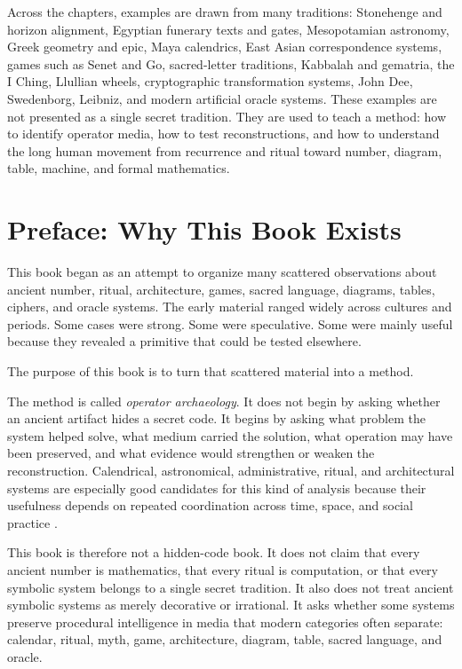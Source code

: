 \documentclass[11pt]{book}
\begin{document}
Across the chapters, examples are drawn from many traditions: Stonehenge and horizon alignment, Egyptian funerary texts and gates, Mesopotamian astronomy, Greek geometry and epic, Maya calendrics, East Asian correspondence systems, games such as Senet and Go, sacred-letter traditions, Kabbalah and gematria, the I Ching, Llullian wheels, cryptographic transformation systems, John Dee, Swedenborg, Leibniz, and modern artificial oracle systems. These examples are not presented as a single secret tradition. They are used to teach a method: how to identify operator media, how to test reconstructions, and how to understand the long human movement from recurrence and ritual toward number, diagram, table, machine, and formal mathematics.

\chapter*{Preface: Why This Book Exists}

This book began as an attempt to organize many scattered observations about ancient number, ritual, architecture, games, sacred language, diagrams, tables, ciphers, and oracle systems. The early material ranged widely across cultures and periods. Some cases were strong. Some were speculative. Some were mainly useful because they revealed a primitive that could be tested elsewhere.

The purpose of this book is to turn that scattered material into a method.

The method is called \emph{operator archaeology}. It does not begin by asking whether an ancient artifact hides a secret code. It begins by asking what problem the system helped solve, what medium carried the solution, what operation may have been preserved, and what evidence would strengthen or weaken the reconstruction. Calendrical, astronomical, administrative, ritual, and architectural systems are especially good candidates for this kind of analysis because their usefulness depends on repeated coordination across time, space, and social practice \cite{Neugebauer1957ExactSciences,Aveni1989EmpiresTime,Clagett1989AncientEgyptianScience1,Assmann2011CulturalMemory}.

This book is therefore not a hidden-code book. It does not claim that every ancient number is mathematics, that every ritual is computation, or that every symbolic system belongs to a single secret tradition. It also does not treat ancient symbolic systems as merely decorative or irrational. It asks whether some systems preserve procedural intelligence in media that modern categories often separate: calendar, ritual, myth, game, architecture, diagram, table, sacred language, and oracle.
\end{document}
